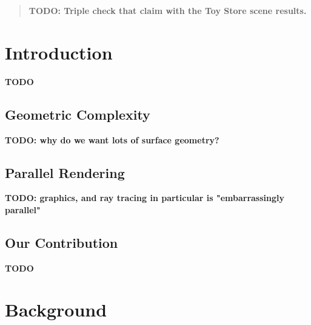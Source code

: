 \documentclass[12pt]{ucthesis}
\begin{document}
\begin{frontmatter}
\begin{abstract}
\textbf{TODO: Triple check that claim with the Toy Store scene results.}

\end{abstract}





\tableofcontents


\listoftables

\listoffigures

\end{frontmatter}

\pagestyle{plain}




\renewcommand{\baselinestretch}{1.66}







\chapter{Introduction}
\label{intro}

\textbf{TODO}

\section{Geometric Complexity}
\label{complexity}

\textbf{TODO: why do we want lots of surface geometry?}

\section{Parallel Rendering}
\label{parallel}

\textbf{TODO: graphics, and ray tracing in particular is "embarrassingly parallel"}

\section{Our Contribution}
\label{contribution}

\textbf{TODO}

\chapter{Background}
\label{background}
\end{document}
